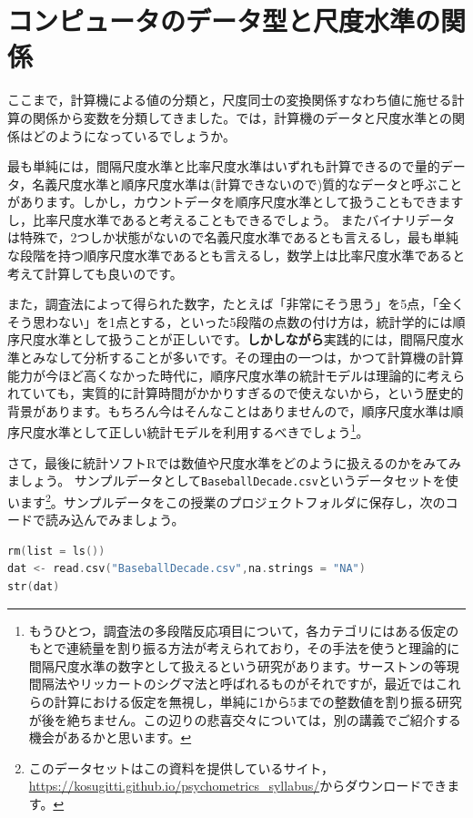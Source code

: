 \documentclass{ltjsbook}
\begin{document}
\section{コンピュータのデータ型と尺度水準の関係}
ここまで，計算機による値の分類と，尺度同士の変換関係すなわち値に施せる計算の関係から変数を分類してきました。では，計算機のデータと尺度水準との関係はどのようになっているでしょうか。

最も単純には，間隔尺度水準と比率尺度水準はいずれも計算できるので量的データ，名義尺度水準と順序尺度水準は(計算できないので)質的なデータと呼ぶことがあります。しかし，カウントデータを順序尺度水準として扱うこともできますし，比率尺度水準であると考えることもできるでしょう。
またバイナリデータは特殊で，2つしか状態がないので名義尺度水準であるとも言えるし，最も単純な段階を持つ順序尺度水準であるとも言えるし，数学上は比率尺度水準であると考えて計算しても良いのです。

また，調査法によって得られた数字，たとえば「非常にそう思う」を5点，「全くそう思わない」を1点とする，といった5段階の点数の付け方は，統計学的には順序尺度水準として扱うことが正しいです。\textbf{しかしながら}実践的には，間隔尺度水準とみなして分析することが多いです。その理由の一つは，かつて計算機の計算能力が今ほど高くなかった時代に，順序尺度水準の統計モデルは理論的に考えられていても，実質的に計算時間がかかりすぎるので使えないから，という歴史的背景があります。もちろん今はそんなことはありませんので，順序尺度水準は順序尺度水準として正しい統計モデルを利用するべきでしょう\footnote{もうひとつ，調査法の多段階反応項目について，各カテゴリにはある仮定のもとで連続量を割り振る方法が考えられており，その手法を使うと理論的に間隔尺度水準の数字として扱えるという研究があります。サーストンの等現間隔法やリッカートのシグマ法と呼ばれるものがそれですが，最近ではこれらの計算における仮定を無視し，単純に1から5までの整数値を割り振る研究が後を絶ちません。この辺りの悲喜交々については，別の講義でご紹介する機会があるかと思います。}。

さて，最後に統計ソフトRでは数値や尺度水準をどのように扱えるのかをみてみましょう。
サンプルデータとして\verb|BaseballDecade.csv|というデータセットを使います\footnote{このデータセットはこの資料を提供しているサイト，\url{https://kosugitti.github.io/psychometrics_syllabus/}からダウンロードできます。}。サンプルデータをこの授業のプロジェクトフォルダに保存し，次のコードで読み込んでみましょう。

\begin{lstlisting}[language=c++,label={code:4_01},caption={データの読み込み}]
rm(list = ls())
dat <- read.csv("BaseballDecade.csv",na.strings = "NA")
str(dat)
\end{lstlisting}
\end{document}
